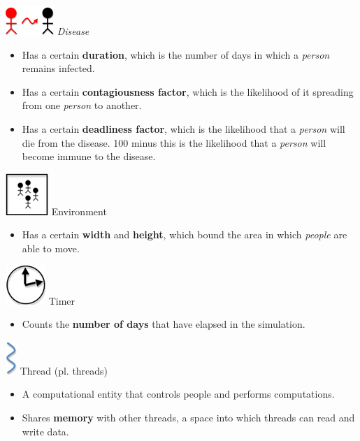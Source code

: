 \documentclass[letterpaper,10pt,openany,oneside]{sphinxmanual}
\begin{document}
\includegraphics{img-1.png} \emph{Disease}
\begin{itemize}
\item {} 
Has a certain \textbf{duration}, which is the number of days in which a \emph{person} remains infected.

\item {} 
Has a certain \textbf{contagiousness factor}, which is the likelihood of it spreading from one \emph{person} to another.

\item {} 
Has a certain \textbf{deadliness factor}, which is the likelihood that a \emph{person} will die from the disease. 100 minus this is the likelihood that a \emph{person} will become immune to the disease.

\end{itemize}

\includegraphics{img-2.png} Environment
\begin{itemize}
\item {} 
Has a certain \textbf{width} and \textbf{height}, which bound the area in which \emph{people} are able to move.

\end{itemize}

\includegraphics{img-3.png} Timer
\begin{itemize}
\item {} 
Counts the \textbf{number of days} that have elapsed in the simulation.

\end{itemize}

\includegraphics{img-4.png} Thread (pl. threads)
\begin{itemize}
\item {} 
A computational entity that controls people and performs computations.

\item {} 
Shares \textbf{memory} with other threads, a space into which threads can read and write data.

\end{itemize}
\end{document}
